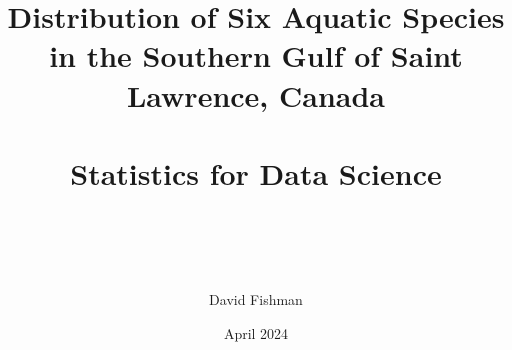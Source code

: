 \title{
    Distribution of Six Aquatic Species in the Southern Gulf of Saint Lawrence, Canada \\~\\
    \large Statistics for Data Science  \\~\\~\\
}


\date{April 2024}

\author[1]{David Fishman}

{
    \makeatletter
    \renewcommand\AB@affilsepx{: \protect\Affilfont}
    \makeatother


    \makeatletter
    \renewcommand\AB@affilsepx{, \protect\Affilfont}
    \makeatother

}

\maketitle
